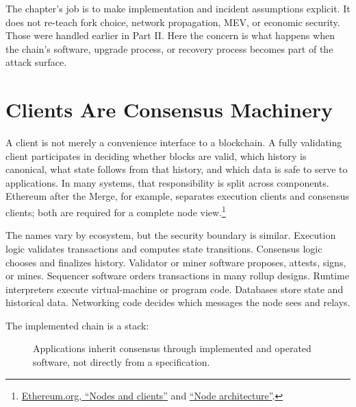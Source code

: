 The chapter's job is to make implementation and incident assumptions explicit. It does not re-teach fork choice, network propagation, MEV, or economic security. Those were handled earlier in Part II. Here the concern is what happens when the chain's software, upgrade process, or recovery process becomes part of the attack surface.

\section{Clients Are Consensus Machinery}

A client is not merely a convenience interface to a blockchain. A fully validating client participates in deciding whether blocks are valid, which history is canonical, what state follows from that history, and which data is safe to serve to applications. In many systems, that responsibility is split across components. Ethereum after the Merge, for example, separates execution clients and consensus clients; both are required for a complete node view.\footnote{\href{https://ethereum.org/developers/docs/nodes-and-clients/}{Ethereum.org, ``Nodes and clients''} and \href{https://ethereum.org/developers/docs/nodes-and-clients/node-architecture/}{``Node architecture''}.}

The names vary by ecosystem, but the security boundary is similar. Execution logic validates transactions and computes state transitions. Consensus logic chooses and finalizes history. Validator or miner software proposes, attests, signs, or mines. Sequencer software orders transactions in many rollup designs. Runtime interpreters execute virtual-machine or program code. Databases store state and historical data. Networking code decides which messages the node sees and relays.

The implemented chain is a stack:

\begin{figure}[htbp]
\centering
{}
\caption{Applications inherit consensus through implemented and operated software, not directly from a specification.}
\end{figure}

